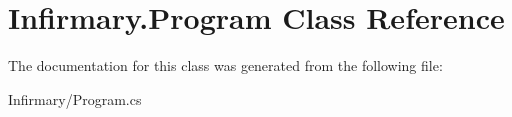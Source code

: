 \hypertarget{class_infirmary_1_1_program}{}\section{Infirmary.\+Program Class Reference}
\label{class_infirmary_1_1_program}


The documentation for this class was generated from the following file\+:\begin{DoxyCompactItemize}
\item 
Infirmary/Program.\+cs\end{DoxyCompactItemize}
